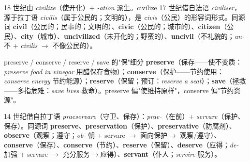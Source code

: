 \documentclass[../main.tex]{subfiles}
\begin{document}



\begin{origin}
18 世纪由 \textit{civilize}（使开化）+ \textit{-ation} 派生。civilize 17 世纪借自法语 \textit{civiliser}，源于拉丁语 \textit{civilis}（属于公民的；文明的），是 \textit{civis}（公民）的形容词形式。同源词 \textbf{civil}（公民的；民事的；文明的）、\textbf{civic}（公民的；城市的）、\textbf{citizen}（公民）、\textbf{city}（城市）、\textbf{uncivilized}（未开化的；野蛮的）、\textbf{uncivil}（不礼貌的；\textit{un-} 不 + \textit{civilis} $\to$ 不像公民的）。
\end{origin}




\begin{lex}{preserve / conserve / reserve / save 的"保"细分}
\textbf{preserve}（保存——使不变质：\textit{preserve food in vinegar} 用醋保存食物）；\textbf{conserve}（保护——节约使用：\textit{conserve energy} 节约能源）；\textbf{reserve}（保留；预订：\textit{reserve a seat}）；\textbf{save}（拯救——多指危难：\textit{save lives} 救命）。preserve 偏"使维持原样"，conserve 偏"节约资源"。
\end{lex}

\begin{origin}
14 世纪借自拉丁语 \textit{praeservare}（守卫、保存）：\textit{prae-}（在前）+ \textit{servare}（保护、保存）。同源词 \textbf{preserve}、\textbf{preservation}（保护）、\textbf{preservative}（防腐剂）、\textbf{observe}（观察；遵守；\textit{ob-} 朝 + servare $\to$ 面向保护$\to$ 观察/遵守）、\textbf{conserve}（保存）、\textbf{conserve}（节约）、\textbf{reserve}（保留）、\textbf{deserve}（应得；\textit{de-} 加强 + servare $\to$ 充分服务$\to$应得）、\textbf{servant}（仆人；\textit{servire} 服务）。
\end{origin}
\end{document}
